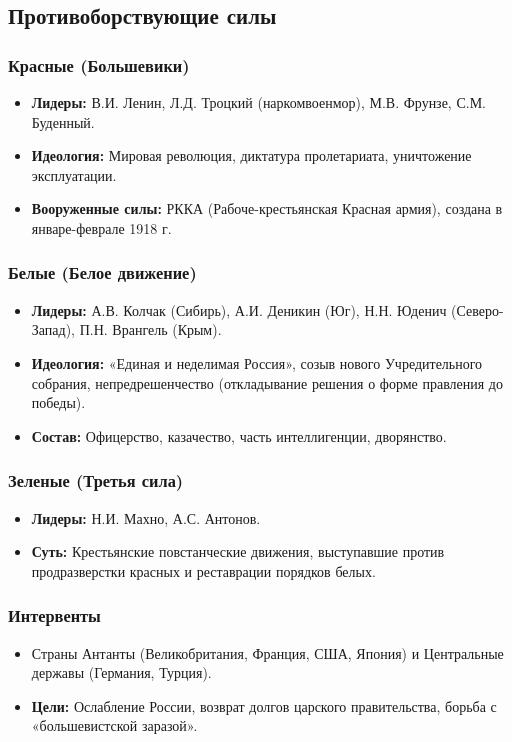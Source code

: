 \documentclass[12pt]{article}
\begin{document}
	\subsection{Противоборствующие силы}
	
	\subsubsection{Красные (Большевики)}
	\begin{itemize}
		\item \textbf{Лидеры:} В.И. Ленин, Л.Д. Троцкий (наркомвоенмор), М.В. Фрунзе, С.М. Буденный.
		\item \textbf{Идеология:} Мировая революция, диктатура пролетариата, уничтожение эксплуатации.
		\item \textbf{Вооруженные силы:} РККА (Рабоче-крестьянская Красная армия), создана в январе-феврале 1918 г.
	\end{itemize}
	
	\subsubsection{Белые (Белое движение)}
	\begin{itemize}
		\item \textbf{Лидеры:} А.В. Колчак (Сибирь), А.И. Деникин (Юг), Н.Н. Юденич (Северо-Запад), П.Н. Врангель (Крым).
		\item \textbf{Идеология:} «Единая и неделимая Россия», созыв нового Учредительного собрания, непредрешенчество (откладывание решения о форме правления до победы).
		\item \textbf{Состав:} Офицерство, казачество, часть интеллигенции, дворянство.
	\end{itemize}
	
	\subsubsection{Зеленые (Третья сила)}
	\begin{itemize}
		\item \textbf{Лидеры:} Н.И. Махно, А.С. Антонов.
		\item \textbf{Суть:} Крестьянские повстанческие движения, выступавшие против продразверстки красных и реставрации порядков белых.
	\end{itemize}
	
	\subsubsection{Интервенты}
	\begin{itemize}
		\item Страны Антанты (Великобритания, Франция, США, Япония) и Центральные державы (Германия, Турция).
		\item \textbf{Цели:} Ослабление России, возврат долгов царского правительства, борьба с «большевистской заразой».
	\end{itemize}
	
\end{document}
